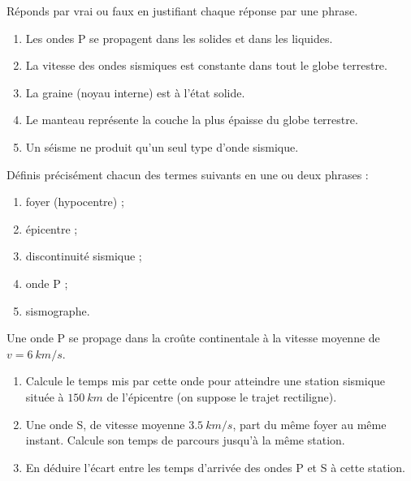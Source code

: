 \documentclass[11pt]{article}
\newcounter{popsec}
\newcounter{popsub}
\newcommand{\courssub}[1]{%
  \stepcounter{popsub}%
  \par\vspace{9pt}\noindent{\popxbold\fontsize{11.5}{13}\selectfont\color{popink}{\color{poporange}\thepopsec.\thepopsub}\hspace{6pt}#1}\par\nopagebreak\vspace{4pt}
}
\begin{document}
\begin{exercice}
Réponds par vrai ou faux en justifiant chaque réponse par une phrase.
\begin{enumerate}
\item Les ondes P se propagent dans les solides et dans les liquides.
\item La vitesse des ondes sismiques est constante dans tout le globe terrestre.
\item La graine (noyau interne) est à l'état solide.
\item Le manteau représente la couche la plus épaisse du globe terrestre.
\item Un séisme ne produit qu'un seul type d'onde sismique.
\end{enumerate}
\end{exercice}

\begin{exercice}[Définitions]
Définis précisément chacun des termes suivants en une ou deux phrases :
\begin{enumerate}
\item foyer (hypocentre) ;
\item épicentre ;
\item discontinuité sismique ;
\item onde P ;
\item sismographe.
\end{enumerate}
\end{exercice}

\begin{exercice}
Une onde P se propage dans la croûte continentale à la vitesse moyenne de $v = \SI{6}{km/s}$.
\begin{enumerate}
\item Calcule le temps mis par cette onde pour atteindre une station sismique située à $\SI{150}{km}$ de l'épicentre (on suppose le trajet rectiligne).
\item Une onde S, de vitesse moyenne $\SI{3,5}{km/s}$, part du même foyer au même instant. Calcule son temps de parcours jusqu'à la même station.
\item En déduire l'écart entre les temps d'arrivée des ondes P et S à cette station.
\end{enumerate}
\end{exercice}

\courssub{Je m'entraîne}
\end{document}
